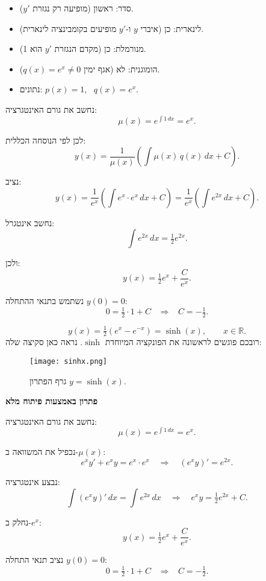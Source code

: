 \documentclass{article}
\numberwithin{equation}{section}
\begin{document}
\begin{itemize}
  \item[] סדר: ראשון (מופיעה רק נגזרת $y'$).
  \item[] לינארית: כן (איברי $y$ ו-$y'$ מופיעים בקומבינציה לינארית).
  \item[] מנורמלת: כן (מקדם הנגזרת $y'$ הוא 1).
  \item[] הומוגנית: לא (אגף ימין $q(x)=e^x \neq 0$).
  \item[] נתונים: $p(x)=1$, \ $q(x)=e^x$.
\end{itemize}

נחשב את גורם האינטגרציה:
\[
\mu(x) = e^{\int 1 \, dx} = e^x.
\]

לכן לפי הנוסחה הכללית:
\[
y(x) = \frac{1}{\mu(x)} \left( \int \mu(x)\,q(x)\,dx + C \right).
\]

נציב:
\[
y(x) = \frac{1}{e^x}\left( \int e^x \cdot e^x\, dx + C\right) 
= \frac{1}{e^x}\left( \int e^{2x}\, dx + C \right).
\]

נחשב אינטגרל:
\[
\int e^{2x}\,dx = \tfrac{1}{2}e^{2x}.
\]

ולכן:
\[
y(x)=\tfrac{1}{2}e^x+\frac{C}{e^x}.
\]

נשתמש בתנאי ההתחלה $y(0)=0$:
\[
0 = \tfrac{1}{2}\cdot 1 + C \;\;\;\Rightarrow\;\;\; C=-\tfrac{1}{2}.
\]

\[
\boxed{\,y(x)=\tfrac{1}{2}(e^x-e^{-x})=\sinh(x),\qquad x\in\mathbb{R}.\,}
\]
רובכם פוגשים לראשונה את הפונקציה המיוחדת $\sinh$. נראה כאן סקיצה שלה:

\begin{figure}[H]
    \centering
    \texttt{[image: sinhx.png]} %
    \caption{\footnotesize גרף הפתרון $y = \sinh(x)$.}
    \label{fig:sinhx}
\end{figure}



\textbf{פתרון באמצעות פיתוח מלא}

נחשב את גורם האינטגרציה:
\[
\mu(x) = e^{\int 1 \, dx} = e^x.
\]

נכפיל את המשוואה ב-$\mu(x)$:
\[
e^x y' + e^x y = e^x \cdot e^x \quad \Rightarrow \quad (e^x y)' = e^{2x}.
\]

נבצע אינטגרציה:
\[
\int (e^x y)'\, dx = \int e^{2x}\, dx 
\quad \Rightarrow \quad e^x y = \tfrac{1}{2}e^{2x} + C.
\]

נחלק ב-$e^x$:
\[
y(x) = \tfrac{1}{2}e^x + \frac{C}{e^x}.
\]

נציב תנאי התחלה $y(0)=0$:
\[
0 = \tfrac{1}{2} \cdot 1 + C \;\;\;\Rightarrow\;\;\; C=-\tfrac{1}{2}.
\]
\end{document}
